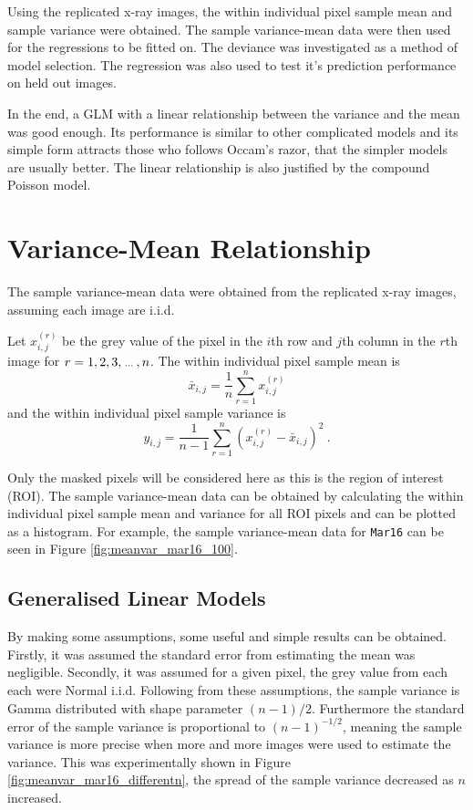Using the replicated x-ray images, the within individual pixel sample mean and sample variance were obtained. The sample variance-mean data were then used for the regressions to be fitted on. The deviance was investigated as a method of model selection. The regression was also used to test it's prediction performance on held out images.

In the end, a GLM with a linear relationship between the variance and the mean was good enough. Its performance is similar to other complicated models and its simple form attracts those who follows Occam's razor, that the simpler models are usually better. The linear relationship is also justified by the compound Poisson model.

\section{Variance-Mean Relationship}

The sample variance-mean data were obtained from the replicated x-ray images, assuming each image are i.i.d.

Let $x_{i,j}^{(r)}$ be the grey value of the pixel in the $i$th row and $j$th column in the $r$th image for $r=1,2,3,\dotdotdot,n$. The within individual pixel sample mean is
\begin{equation}
    \bar{x}_{i,j}=\frac{1}{n}\sum_{r=1}^n x_{i,j}^{(r)}
\end{equation}
and the within individual pixel sample variance is
\begin{equation}
    y_{i,j} =
    \frac{1}{n-1}
    \sum_{r=1}^n
        \left(
            x_{i,j}^{(r)} - \bar{x}_{i,j}
        \right)^2
    \ .
\end{equation}

Only the masked pixels will be considered here as this is the region of interest (ROI). The sample variance-mean data can be obtained by calculating the within individual pixel sample mean and variance for all ROI pixels and can be plotted as a histogram. For example, the sample variance-mean data for \texttt{Mar16} can be seen in Figure \ref{fig:meanvar_mar16_100}.

\subsection{Generalised Linear Models}
By making some assumptions, some useful and simple results can be obtained. Firstly, it was assumed the standard error from estimating the mean was negligible. Secondly, it was assumed for a given pixel, the grey value from each each were Normal i.i.d. Following from these assumptions, the sample variance is Gamma distributed with shape parameter $(n-1)/2$. Furthermore the standard error of the sample variance is proportional to $(n-1)^{-1/2}$, meaning the sample variance is more precise when more and more images were used to estimate the variance. This was experimentally shown in Figure \ref{fig:meanvar_mar16_differentn}, the spread of the sample variance decreased as $n$ increased.

